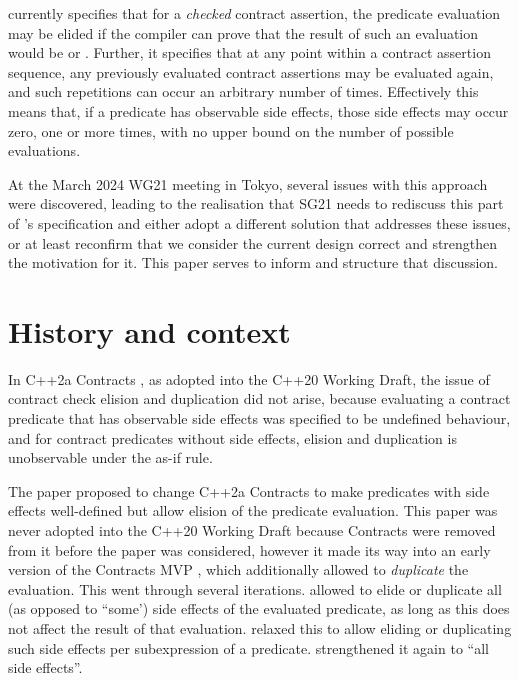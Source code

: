 \cite{P2900R6} currently specifies that for a \emph{checked} contract assertion, the predicate evaluation may be elided if the compiler can prove that the result of such an evaluation would be  or . Further, it specifies that at any point within a contract assertion sequence, any previously evaluated contract assertions may be evaluated again, and such repetitions can occur an arbitrary number of times. Effectively this means that, if a predicate has observable side effects, those side effects may occur zero, one or more times, with no upper bound on the number of possible evaluations.

At the March 2024 WG21 meeting in Tokyo, several issues with this approach were discovered, leading to the realisation that SG21 needs to rediscuss this part of \cite{P2900R6}'s specification and either adopt a different solution that addresses these issues, or at least reconfirm that we consider the current design correct and strengthen the motivation for it.  This paper serves to inform and structure that discussion.


\section{History and context}

In C++2a Contracts \cite{P0542R5}, as adopted into the C++20 Working Draft, the issue of contract check elision and duplication did not arise, because evaluating a contract predicate that has observable side effects was specified to be undefined behaviour, and for contract predicates without side effects, elision and duplication is unobservable under the as-if rule.

The paper \cite{P1670R0} proposed to change C++2a Contracts to make predicates with side effects well-defined but allow elision of the predicate evaluation. This paper was never adopted into the C++20 Working Draft because Contracts were removed from it before the paper was considered, however it made its way into an early version of the Contracts MVP \cite{P2388R4}, which additionally allowed to \emph{duplicate} the evaluation. This went through several iterations. \cite{P2388R0} allowed to elide or duplicate all (as opposed to ``some') side effects of the evaluated predicate, as long as this does not affect the result of that evaluation. \cite{P2388R3} relaxed this to allow eliding or duplicating such side effects per subexpression of a predicate. \cite{P2521R5} strengthened it again to ``all side effects''.

